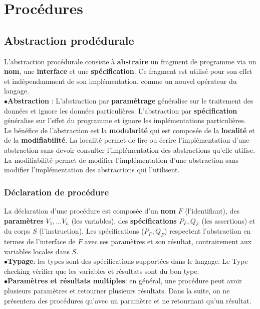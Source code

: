 \section{Procédures}
\subsection{Abstraction prodédurale}
L'abstraction procédurale consiste à \textbf{abstraire} un fragment de programme via un \textbf{nom}, une \textbf{interface} et une \textbf{spécification}. Ce fragment est utilisé pour son effet et indépendamment de son implémentation, comme un nouvel opérateur du langage.\\

$\bullet$\textbf{Abstraction} : L'abstraction par \textbf{paramétrage} généralise sur le traitement des données et ignore les données particulières. L'abstraction par \textbf{spécification} généralise sur l'effet du programme et ignore les implémentations particulières.\\
Le bénéfice de l'abstraction est la \textbf{modularité} qui est composée de la \textbf{localité} et de la \textbf{modifiabilité}. La localité permet de lire ou écrire l'implémentation d'une abstraction sans devoir consulter l'implémentation des abstractions qu'elle utilise. La modifiabilité permet de modifier l'implémentation d'une abstraction sans modifier l'implémentation des abstractions qui l'utilisent.
\subsubsection{Déclaration de procédure}
La déclaration d'une procédure est composée d'un \textbf{nom} $F$ (l'identifiant), des \textbf{paramètres} $V_1,...V_n$ (les variables), des \textbf{spécifications} $P_F,Q_F$ (les assertions) et du corps $S$ (l'instruction). Les spécifications ($P_F,Q_F$) respectent l'abstraction en termes de l'interface de $F$ avec ses paramètres et son résultat, contrairement aux variables locales dans $S$.\\

$\bullet$\textbf{Typage}: les types sont des spécifications supportées dans le langage. Le Type-checking vérifier que les variables et résultats sont du bon type.
\\

$\bullet$\textbf{Paramètres et résultats multiples}: en général, une procédure peut avoir plusieurs paramètres et retourner plusieurs résultats. Dans la suite, on ne présentera des procédures qu'avec un paramètre et ne retournant qu'un résultat. 
\\

